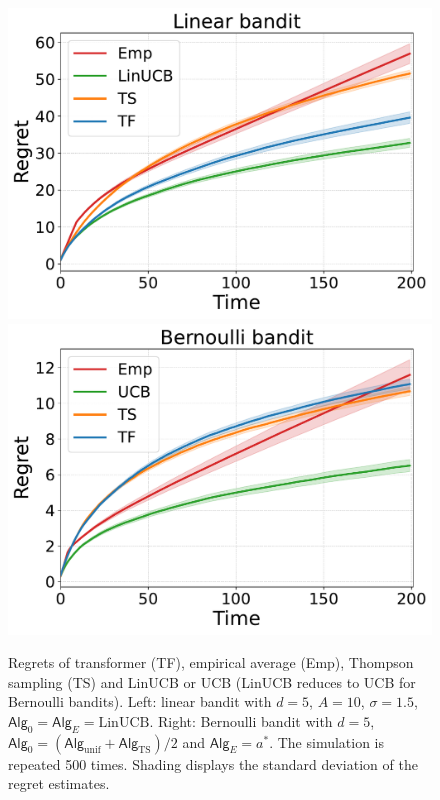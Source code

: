 \documentclass[10pt]{article}
\newcommand{\<}{\left\langle}
\renewcommand{\>}{\right\rangle}
\newcommand{\TF}{{\rm TF}}
\newcommand{\LinUCB}{{\mathrm{LinUCB}}}
\newcommand{\TS}{{\mathrm{TS}}}
\newcommand{\action}{{a}}
\newcommand{\totlen}{{T}} %
\newcommand{\sAlg}{{\mathsf{Alg}}}
\newcommand{\EstPar}{{\widehat{\theta}}}
\newcommand{\shortexp}{{E}}
\def\sA{{\mathbb{A}}}
\def\be{{\mathbf e}}
\def\bw{{\mathbf w}}
\begin{document}




\begin{figure}[t]
\centering  %
\includegraphics[width=0.35\linewidth]{Sections/figs/record_2_cum_True.pdf}
\hspace{2em}
\includegraphics[width=0.35\linewidth]{Sections/figs/record_1_cum_True.pdf}
\vspace{-1em}
\caption{Regrets of transformer (TF), empirical average (Emp), Thompson sampling (TS) and LinUCB or UCB (LinUCB reduces to UCB for Bernoulli bandits). Left: linear bandit with $d=5$, $A=10$, $\sigma=1.5$, $\sAlg_0=\sAlg_\shortexp=\LinUCB$. Right: Bernoulli bandit with $d=5$, $\sAlg_0=(\sAlg_{\mathrm{unif}}+\sAlg_{\TS})/2$ and $\sAlg_\shortexp=\action^*$. The simulation is repeated 500 times. Shading displays the standard deviation of the regret estimates. } 
\label{fig:regret_1} 
\end{figure}
\end{document}
